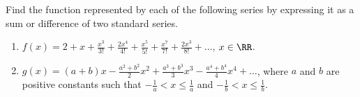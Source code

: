 \begin{problem}[\chili]
    Find the function represented by each of the following series by expressing it as a sum or difference of two standard series.
    \begin{enumerate}
        \item $f(x) = 2+x+\frac{x^{3}}{3!}+\frac{2x^{4}}{4!}+\frac{x^{5}}{5!}+\frac{x^{7}}{7!}+\frac{2x^{3}}{8!}+\dots$, $x\in\RR$.
        \item $g(x)= (a+b)x-\frac{a^{2}+b^{2}}{2}x^{2}+\frac{a^{3}+b^{3}}{3}x^3 - \frac{a^4 + b^4}4 x^4 + \dots$, where $a$ and $b$ are positive constants such that $-\frac1a < x \leq \frac1a$ and $-\frac1b < x \leq \frac1b$.
    \end{enumerate}
\end{problem}